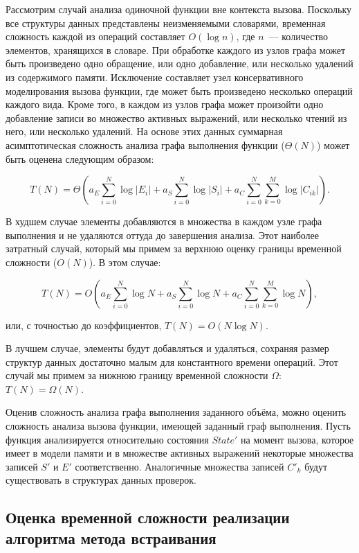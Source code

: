 Рассмотрим случай анализа одиночной функции вне контекста вызова. Поскольку все структуры данных представлены неизменяемыми словарями, временная сложность каждой из операций составляет $O(\log n)$, где $n$~--- количество элементов, хранящихся в словаре. При обработке каждого из узлов графа может быть произведено одно обращение, или одно добавление, или несколько удалений из содержимого памяти. Исключение составляет узел консервативного моделирования вызова функции, где может быть произведено несколько операций каждого вида. Кроме того, в каждом из узлов графа может произойти одно добавление записи во множество активных выражений, или несколько чтений из него, или несколько удалений. На основе этих данных суммарная асимптотическая сложность анализа графа выполнения функции ($\Theta(N)$) может быть оценена следующим образом:

\begin{equation}
 T(N) = \Theta \left(a_E \sum_{i=0}^N \log |E_i| + a_S \sum_{i=0}^N \log |S_i|  + a_C \sum_{i=0}^N \sum_{k=0}^M \log |C_{ik}|\right).
\end{equation}

В худшем случае элементы добавляются в множества в каждом узле графа выполнения и не удаляются оттуда до завершения анализа. Этот наиболее затратный случай, который мы примем за верхнюю оценку границы временной сложности ($O(N)$). В этом случае:

\begin{equation}
 T(N) = O \left(a_E \sum_{i=0}^N \log N + a_S \sum_{i=0}^N \log N  + a_C \sum_{i=0}^N \sum_{k=0}^M \log N \right),
\end{equation}

или, с точностью до коэффициентов, $T(N) = O(N \log N)$.

В лучшем случае, элементы будут добавляться и удаляться, сохраняя размер структур данных достаточно малым для константного времени операций. Этот случай мы примем за нижнюю границу временной сложности $\Omega$: $T(N) = \Omega(N)$.

Оценив сложность анализа графа выполнения заданного объёма, можно оценить сложность анализа вызова функции, имеющей заданный граф выполнения. Пусть функция анализируется относительно состояния $State'$ на момент вызова, которое имеет в модели памяти и в множестве активных выражений некоторые множества записей $S'$ и $E'$ соответственно. Аналогичные множества записей $C'_k$ будут существовать в структурах данных проверок.

\subsection{Оценка временной сложности реализации алгоритма метода встраивания}

